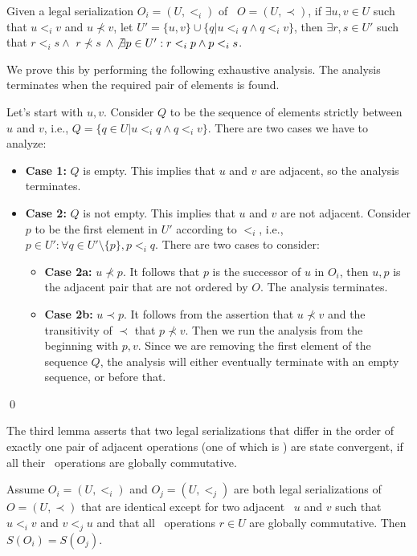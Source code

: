 \begin{lemma}\label{lem:adjexists}
Given a legal serialization $O_i=(U,<_i)$ of \RBo\ $O=(U,\prec)$, if
$\exists u,v\in U$ such that $u<_i v$ and $u\not\prec v$,
let $U' = \{u,v\} \cup \{q|u<_i q\wedge q<_i v\}$, then $\exists r, s \in U'$ such that $r<_i s \wedge$ $r\not\prec s$ $\wedge \not\exists p \in U': r<_i p\wedge p <_i s$.
\end{lemma}

We prove this by performing the following exhaustive analysis. The analysis
terminates when the required pair of elements is found.

Let's start with $u, v$. Consider $Q$ to be the sequence of elements strictly between $u$ and $v$, i.e.,
$Q=\{q\in U| u<_i q \wedge q <_i v\}$. There are two cases we have to analyze:
\begin{itemize}
\item {\bf Case 1:} $Q$ is empty. This implies that $u$ and $v$ are adjacent, so the analysis
terminates.

\item {\bf Case 2:} $Q$ is not empty. This implies that $u$ and $v$ are not adjacent.
Consider $p$ to be the first element in $U'$ according to $<_i$, i.e.,
$p\in U': \forall q\in U'\setminus\{p\}, p<_i q$. There are two cases to consider:
\begin{itemize}
\item {\bf Case 2a:} $u\not\prec p$. It follows that $p$ is the successor of $u$ in
$O_i$, then $u, p$ is the adjacent pair that are not ordered by $O$. The analysis
terminates.

\item {\bf Case 2b:} $u\prec p$. It follows from the assertion that $u\not\prec v$
and the transitivity of $\prec$ that $p\not\prec v$. Then we run
the analysis from the beginning with $p,v$. Since we are removing
the first element of the sequence $Q$, the analysis will either eventually
terminate with an empty sequence, or before that.
\end{itemize}
\end{itemize}
\qed


The third lemma asserts that two legal serializations that differ
in the order of exactly one pair of adjacent operations (one of which
is \blue) are state convergent, if all their \blue\ operations are globally
commutative.

\begin{lemma}\label{lem:adjacentconvergent}
Assume $O_i=(U,<_i)$ and $O_j=(U,<_j)$ are both legal
serializations of \RBo\ $O=(U,\prec)$ that are identical except for
two adjacent \transactions\ $u$ and $v$ such that $u<_iv$ and $v<_ju$ and that all
\blue\ operations $r\in U$ are globally commutative. Then
$S(O_i)=S(O_j)$.
\end{lemma}

